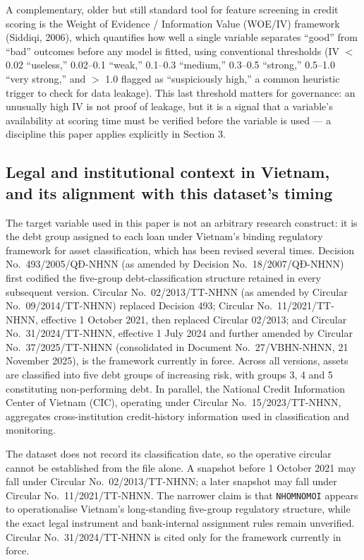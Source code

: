 \documentclass[11pt,a4paper]{article}
\begin{document}
A complementary, older but still standard tool for feature screening in credit scoring is the Weight of Evidence / Information Value (WOE/IV) framework (Siddiqi, 2006), which quantifies how well a single variable separates ``good'' from ``bad'' outcomes before any model is fitted, using conventional thresholds (IV $<$ 0.02 ``useless,'' 0.02--0.1 ``weak,'' 0.1--0.3 ``medium,'' 0.3--0.5 ``strong,'' 0.5--1.0 ``very strong,'' and $>$ 1.0 flagged as ``suspiciously high,'' a common heuristic trigger to check for data leakage). This last threshold matters for governance: an unusually high IV is not proof of leakage, but it is a signal that a variable's availability at scoring time must be verified before the variable is used --- a discipline this paper applies explicitly in Section 3.

\subsection{Legal and institutional context in Vietnam, and its alignment with this dataset's timing}

The target variable used in this paper is not an arbitrary research construct: it is the debt group assigned to each loan under Vietnam's binding regulatory framework for asset classification, which has been revised several times. Decision No.\ 493/2005/QĐ-NHNN (as amended by Decision No.\ 18/2007/QĐ-NHNN) first codified the five-group debt-classification structure retained in every subsequent version. Circular No.\ 02/2013/TT-NHNN (as amended by Circular No.\ 09/2014/TT-NHNN) replaced Decision 493; Circular No.\ 11/2021/TT-NHNN, effective 1 October 2021, then replaced Circular 02/2013; and Circular No.\ 31/2024/TT-NHNN, effective 1 July 2024 and further amended by Circular No.\ 37/2025/TT-NHNN (consolidated in Document No.\ 27/VBHN-NHNN, 21 November 2025), is the framework currently in force. Across all versions, assets are classified into five debt groups of increasing risk, with groups 3, 4 and 5 constituting non-performing debt. In parallel, the National Credit Information Center of Vietnam (CIC), operating under Circular No.\ 15/2023/TT-NHNN, aggregates cross-institution credit-history information used in classification and monitoring.

The dataset does not record its classification date, so the operative circular cannot be established from the file alone. A snapshot before 1 October 2021 may fall under Circular No.\ 02/2013/TT-NHNN; a later snapshot may fall under Circular No.\ 11/2021/TT-NHNN. The narrower claim is that \texttt{NHOMNOMOI} appears to operationalise Vietnam's long-standing five-group regulatory structure, while the exact legal instrument and bank-internal assignment rules remain unverified. Circular No.\ 31/2024/TT-NHNN is cited only for the framework currently in force.
\end{document}
